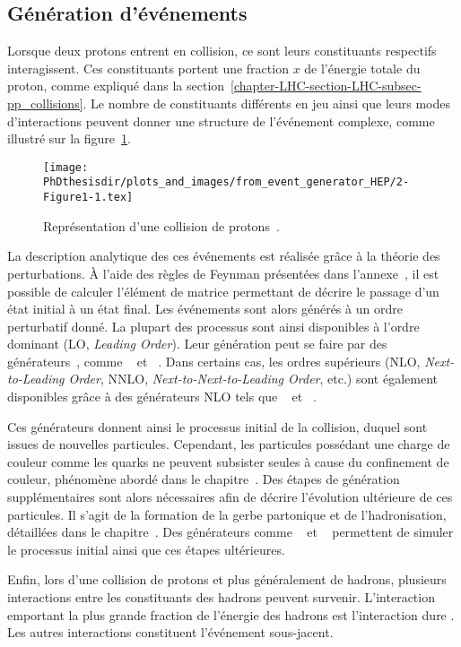 \subsection{Génération d'événements}\label{chapter-LHC-section-MC-subsec-evt_gen}
Lorsque deux protons entrent en collision, ce sont leurs constituants respectifs interagissent.
Ces constituants portent une fraction $x$ de l'énergie totale du proton, comme expliqué dans la section~\ref{chapter-LHC-section-LHC-subsec-pp_collisions}.
Le nombre de constituants différents en jeu ainsi que leurs modes d'interactions peuvent donner une structure de l'événement complexe, comme illustré sur la figure~\ref{fig-event_generator_HEP-2-Figure1-1}.
\begin{figure}[h]
\centering
\texttt{[image: \\PhDthesisdir/plots\_and\_images/from\_event\_generator\_HEP/2-Figure1-1.tex]}
\caption[Représentation d'une collision de protons.]{Représentation d'une collision de protons~\cite{event_generator_HEP}.}
\label{fig-event_generator_HEP-2-Figure1-1}
\end{figure}
\par La description analytique des ces événements est réalisée grâce à la théorie des perturbations.
À l'aide des règles de Feynman présentées dans l'annexe~, il est possible de calculer l'\og élément de matrice \fg{} permettant de décrire le passage d'un état initial à un état final.
Les événements sont alors générés à un ordre perturbatif donné.
La plupart des processus sont ainsi disponibles à l'ordre dominant (LO, \emph{Leading Order}).
Leur génération peut se faire par des générateurs~\cite{CAVENDISH-HEP-10-21}, comme
\MADGRAPH~\cite{madgraph5} et
\PYTHIA~\cite{pythia6.4,pythia8.2}.
Dans certains cas, les ordres supérieurs (NLO, \emph{Next-to-Leading Order}, NNLO, \emph{Next-to-Next-to-Leading Order}, etc.) sont également disponibles grâce à des générateurs NLO tels que
\POWHEG~\cite{Alioli:2010xd} et
\MCATNLO~\cite{MCATNLO}.
\par Ces générateurs donnent ainsi le processus initial de la collision, duquel sont issues de nouvelles particules.
Cependant, les particules possédant une charge de couleur comme les quarks ne peuvent subsister seules à cause du confinement de couleur, phénomène abordé dans le chapitre~.
Des étapes de génération supplémentaires sont alors nécessaires afin de décrire l'évolution ultérieure de ces particules.
Il s'agit de la formation de la gerbe partonique et de l'hadronisation, détaillées dans le chapitre~.
Des générateurs comme
\PYTHIA~\cite{pythia6.4,pythia8.2} et
\HERWIG~\cite{herwig}
permettent de simuler le processus initial ainsi que ces étapes ultérieures.
\par Enfin, lors d'une collision de protons et plus généralement de hadrons, plusieurs interactions entre les constituants des hadrons peuvent survenir.
L'interaction emportant la plus grande fraction de l'énergie des hadrons est l'\og interaction dure \fg{}.
Les autres interactions constituent l'événement sous-jacent.
